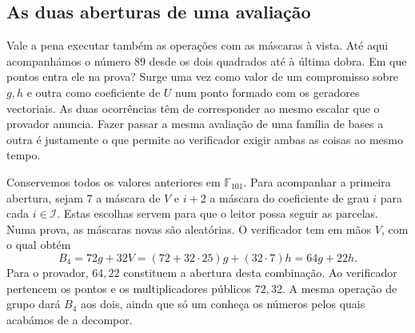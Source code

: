 \subsection{As duas aberturas de uma avaliação}
\label{sec:gbp-duas-aberturas}

Vale a pena executar também as operações com as máscaras à vista.
Até aqui acompanhámos o número \(89\) desde os dois quadrados até
à última dobra. Em que pontos entra ele na prova? Surge uma vez como
valor de um compromisso sobre \(g,h\) e outra como coeficiente de
\(U\) num ponto formado com os geradores vectoriais. As duas
ocorrências têm de corresponder ao mesmo escalar que o provador
anuncia. Fazer passar a mesma avaliação de uma família de bases a
outra é justamente o que permite ao verificador exigir ambas as
coisas ao mesmo tempo.

Conservemos todos os valores anteriores em \(\mathbb F_{101}\).
Para acompanhar a primeira abertura, sejam \(7\) a máscara de
\(V\) e \(i+2\) a máscara do coeficiente de grau \(i\) para
cada \(i\in\mathcal I\). Estas escolhas servem para que o leitor
possa seguir as parcelas. Numa prova, as máscaras novas são
aleatórias. O verificador tem em mãos \(V\), com o qual obtém
\[
 B_4=72g+32V=(72+32\cdot25)g+(32\cdot7)h=64g+22h.
\]
Para o provador, \(64,22\) constituem a abertura desta combinação.
Ao verificador pertencem os pontos e os multiplicadores públicos
\(72,32\). A mesma operação de grupo dará \(B_4\) aos dois, ainda
que só um conheça os números pelos quais acabámos de a decompor.

